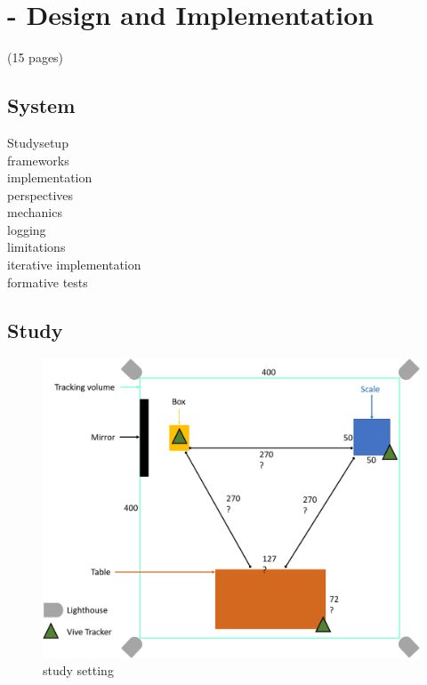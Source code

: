 \chapter{\exgo - Design and Implementation}
(15 pages)
\section{System}
Studysetup\\
frameworks\\
implementation\\
perspectives\\
mechanics\\
logging\\
limitations\\
iterative implementation\\
formative tests\\
\section{Study}

\begin{figure}[htb]
	\centering
	\includegraphics[width=\textwidth]{figures/study_setting.png}
	\caption[study setting]{study setting}
	\label{fig:study_setting}
\end{figure}

